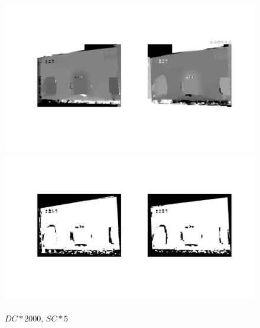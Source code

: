 \documentclass[12pt]{article}
\begin{document}
\begin{figure}[H]
	\centering
	\includegraphics[width=1.1\textwidth]{gc_2000_5_1.jpg}
	\includegraphics[width=1.1\textwidth]{gc_2000_5_2.jpg}
	\caption{$DC*2000$, $SC*5$}
	\label{fig1}
\end{figure}
\vspace{5mm}
\end{document}
